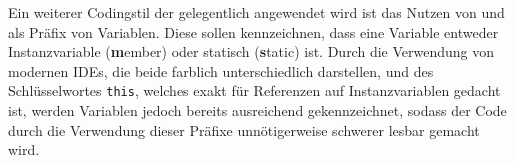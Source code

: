 Ein weiterer Codingstil der gelegentlich angewendet wird ist das Nutzen von  und  als Präfix von Variablen. Diese sollen kennzeichnen, dass eine Variable entweder Instanzvariable (\textbf{m}ember) oder statisch (\textbf{s}tatic) ist. Durch die Verwendung von modernen IDEs, die beide farblich unterschiedlich darstellen, und des Schlüsselwortes \texttt{this}, welches exakt für Referenzen auf Instanzvariablen gedacht ist, werden Variablen jedoch bereits ausreichend gekennzeichnet, sodass der Code durch die Verwendung dieser Präfixe unnötigerweise schwerer lesbar gemacht wird.


